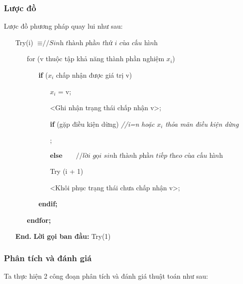 \subsubsection{Lược đồ}
Lược đồ phương pháp quay lui như sau:
\begin{itemize}
    \item [] Try(i) $\equiv \textit{//Sinh thành phần thứ i của cấu hình}$
        \begin{itemize}
            \item [] for (v thuộc tập khả năng thành phần nghiệm $x_i$)
                \begin{itemize}
                    \item [] \textbf{if} ($x_i$ chấp nhận được giá trị v)
                        \begin{itemize}
                            \item [] $x_i$ = v;
                            \item [] <Ghi nhận trạng thái chấp nhận v>;
                            \item [] \textbf{if} (gặp điều kiện dừng) \textit{//i=n hoặc $x_i$ thỏa mãn điều kiện dừng}
                            \item [] ;
                            \item [] $\textbf{else} \qquad \textit{//lời gọi sinh thành phần tiếp theo của cấu hình}$
                                \item [] \qquad Try (i + 1)
                            \item [] <Khôi phục trạng thái chưa chấp nhận v>;
                        \end{itemize}
                    \item [] \textbf{endif;}
                \end{itemize}
            \item [] \quad \textbf{endfor;}
        \end{itemize}
    \item [] \qquad \textbf{End.} \hfill \textbf{Lời gọi ban đầu:} Try(1)
\end{itemize}


\subsubsection{Phân tích và đánh giá}
Ta thực hiện 2 công đoạn phân tích và đánh giá thuật toán như sau:

